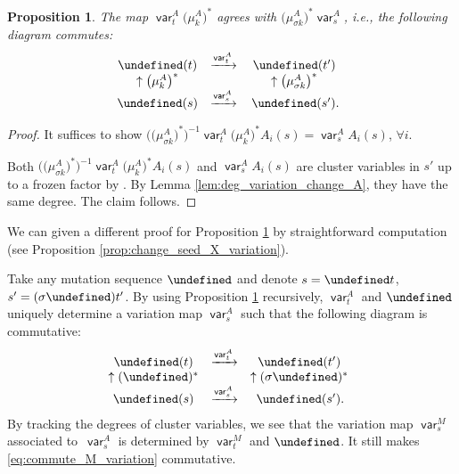 \documentclass[10pt,a4paper]{amsart}
\newcommand{\opname}[1]{\operatorname{\mathsf{#1}}}
\newcommand{\var}{\opname{var}}
\let\upClAlg\undefined
\let\seq\undefined
\newcommand{\upClAlg}{\mathcal{U}^A}
\newcommand{\seq}{\boldsymbol{\mu}}%
\numberwithin{equation}{section}
\newtheorem{Proposition}[Theorem]{Proposition}
 { \theoremstyle{definition}
\newtheorem{Definition}[Theorem]{Definition}
\newtheorem{Note}[Theorem]{Note}
\newtheorem{Example}[Theorem]{Example}
\newtheorem{Remark}[Theorem]{Remark}
\newtheorem{Assumption}[Theorem]{Assumption}
}
\begin{document}
\begin{Proposition}\label{prop:change_seed_A_variation}
The map $\var_{t}^{A}\big(\mu_{k}^{A}\big)^{*}$ agrees with $\big(\mu_{\sigma k}^{A}\big)^{*}\var_{s}^{A}$,
i.e., the following diagram commutes:
\begin{align*}%
\begin{array}{@{}ccc}
 \upClAlg(t) & \xrightarrow{\var_{t}^{A}} & \upClAlg(t')\\
\uparrow\big(\mu_{k}^{A}\big)^{*} & & \uparrow\big(\mu_{\sigma k}^{A}\big)^{*}\\
\upClAlg(s) & \xrightarrow{\var_{s}^{A}} &\,\upClAlg(s').
\end{array}
\end{align*}
\end{Proposition}

\begin{proof}
It suffices to show $\big(\big(\mu_{\sigma k}^{A}\big)^{*}\big)^{-1}\var_{t}^{A}\big(\mu_{k}^{A}\big)^{*}A_{i}(s)=\var_{s}^{A}A_{i}(s)$, $\forall i$.

Both $\big(\big(\mu_{\sigma k}^{A}\big)^{*}\big)^{-1}\var_{t}^{A}\big(\mu_{k}^{A}\big)^{*}A_{i}(s)$
and $\var_{s}^{A}A_{i}(s)$ are cluster variables in $s'$ up to a
frozen factor by \cite[Lemma 4.2.2]{qin2017triangular}. By Lemma
\ref{lem:deg_variation_change_A}, they have the same degree.
The claim follows.
\end{proof}

We can given a different proof for Proposition \ref{prop:change_seed_A_variation}
by straightforward computation (see Proposition \ref{prop:change_seed_X_variation}).

Take any mutation sequence $\seq$ and denote $s=\seq t$, $s'=(\sigma\seq)t'$.
By using Proposition \ref{prop:change_seed_A_variation} recursively,
$\var_{t}^{A}$ and $\seq$ uniquely determine a variation map $\var_{s}^{A}$
such that the following diagram is commutative:
\begin{align*}
\begin{array}{@{}ccc}
\upClAlg(t) & \xrightarrow{\var_{t}^{A}} & \upClAlg(t')\\
\uparrow(\seq)^{*} & & \uparrow(\sigma\seq)^{*}\\
\upClAlg(s) & \xrightarrow{\var_{s}^{A}} & \,\upClAlg(s').
\end{array}%
\end{align*}
By tracking the degrees of cluster variables, we see that the variation
map $\var_{s}^{M}$ associated to~$\var_{s}^{A}$ is determined
by $\var_{t}^{M}$ and $\seq$. It still makes \eqref{eq:commute_M_variation}
commutative.
\end{document}
